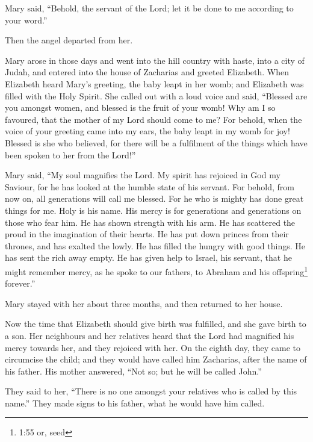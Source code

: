  Mary said, ``Behold, the servant of the Lord; let it be
done to me according to your word.''

Then the angel departed from her.

 Mary arose in those days and went into the hill country
with haste, into a city of Judah,  and entered into the
house of Zacharias and greeted Elizabeth.  When Elizabeth
heard Mary's greeting, the baby leapt in her womb; and Elizabeth was
filled with the Holy Spirit.  She called out with a loud
voice and said, ``Blessed are you amongst women, and blessed is the
fruit of your womb!  Why am I so favoured, that the mother
of my Lord should come to me?  For behold, when the voice
of your greeting came into my ears, the baby leapt in my womb for joy!
 Blessed is she who believed, for there will be a
fulfilment of the things which have been spoken to her from the Lord!''

 Mary said, ``My soul magnifies the Lord.  My
spirit has rejoiced in God my Saviour,  for he has looked
at the humble state of his servant. For behold, from now on, all
generations will call me blessed.  For he who is mighty has
done great things for me. Holy is his name.  His mercy is
for generations and generations on those who fear him.  He
has shown strength with his arm. He has scattered the proud in the
imagination of their hearts.  He has put down princes from
their thrones, and has exalted the lowly.  He has filled
the hungry with good things. He has sent the rich away empty.
 He has given help to Israel, his servant, that he might
remember mercy,  as he spoke to our fathers, to Abraham and
his offspring\footnote{1:55 or, seed} forever.''

 Mary stayed with her about three months, and then returned
to her house.

 Now the time that Elizabeth should give birth was
fulfilled, and she gave birth to a son.  Her neighbours and
her relatives heard that the Lord had magnified his mercy towards her,
and they rejoiced with her.  On the eighth day, they came
to circumcise the child; and they would have called him Zacharias, after
the name of his father.  His mother answered, ``Not so; but
he will be called John.''

 They said to her, ``There is no one amongst your relatives
who is called by this name.''  They made signs to his
father, what he would have him called.

